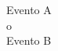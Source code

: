 \documentclass[preview]{standalone}
\begin{document}
\begin{center}
Evento A\\ o \\ Evento B
\end{center}
\end{document}
